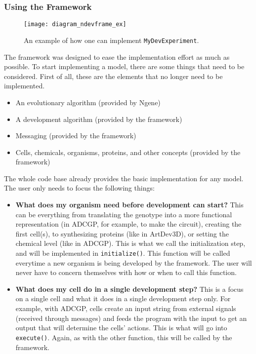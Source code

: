 \subsubsection{Using the Framework}
\begin{figure}[!ht]
	\centering
	\texttt{[image: diagram\_ndevframe\_ex]}
	\caption{An example of how one can implement \texttt{MyDevExperiment}.}
	\label{fig:diagram_ndevframe_ex}
\end{figure}

The framework was designed to ease the implementation effort as much as possible. To start implementing a model, there are some things that need to be considered. First of all, these are the elements that no longer need to be implemented.

\begin{itemize}
	\itemsep=0pt
	\item An evolutionary algorithm (provided by Ngene)
	\item A development algorithm (provided by the framework)
	\item Messaging (provided by the framework)
	\item Cells, chemicals, organisms, proteins, and other concepts (provided by the framework)
\end{itemize}

\noindent The whole code base already provides the basic implementation for any model. The user only needs to focus the following things:

\begin{itemize}
	\itemsep=0pt
	\item\textbf{What does my organism need before development can start?} This can be everything from translating the genotype into a more functional representation (in ADCGP, for example, to make the circuit), creating the first cell(s), to synthesizing proteins (like in ArtDev3D), or setting the chemical level (like in ADCGP). This is what we call the initialization step, and will be implemented in \texttt{initialize()}. This function will be called everytime a new organism is being developed by the framework. The user will never have to concern themselves with how or when to call this function.
	\item\textbf{What does my cell do in a single development step?} This is a focus on a single cell and what it does in a single development step only. For example, with ADCGP, cells create an input string from external signals (received through messages) and feeds the program with the input to get an output that will determine the cells' actions. This is what will go into \texttt{execute()}. Again, as with the other function, this will be called by the framework.
\end{itemize}

